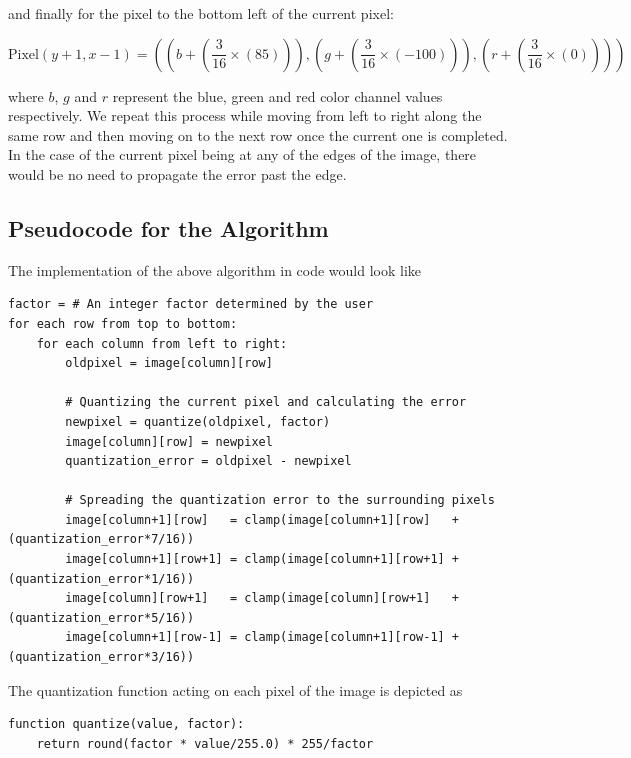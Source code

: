 \documentclass{article}
\begin{document}
\noindent and finally for the pixel to the bottom left of the current pixel:

$$
    \text{Pixel}(y+1,x-1) = \left(\left(b+\left(\frac{3}{16}\times(85)\right)\right),\left(g+\left(\frac{3}{16}\times(-100)\right)\right),\left(r+\left(\frac{3}{16}\times(0)\right)\right)\right)
$$

\noindent where $b$, $g$ and $r$ represent the blue, green and red color channel values respectively. We repeat this process while moving from left to right along the same row and then moving on to the next row once the current one is completed. In the case of the current pixel being at any of the edges of the image, there would be no need to propagate the error past the edge.

\subsection{Pseudocode for the Algorithm}\label{Floyd-Steinberg Pseudocode}

The implementation of the above algorithm in code would look like

\begin{verbatim}
factor = # An integer factor determined by the user
for each row from top to bottom:
    for each column from left to right:
        oldpixel = image[column][row]

        # Quantizing the current pixel and calculating the error
        newpixel = quantize(oldpixel, factor)
        image[column][row] = newpixel
        quantization_error = oldpixel - newpixel

        # Spreading the quantization error to the surrounding pixels
        image[column+1][row]   = clamp(image[column+1][row]   + (quantization_error*7/16))
        image[column+1][row+1] = clamp(image[column+1][row+1] + (quantization_error*1/16))
        image[column][row+1]   = clamp(image[column][row+1]   + (quantization_error*5/16))
        image[column+1][row-1] = clamp(image[column+1][row-1] + (quantization_error*3/16))
\end{verbatim}

\noindent The quantization function acting on each pixel of the image is depicted as
\begin{verbatim}
function quantize(value, factor):
    return round(factor * value/255.0) * 255/factor
\end{verbatim}
\end{document}
